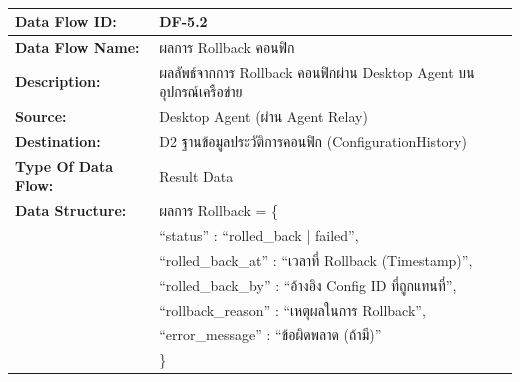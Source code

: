 \begin{table}[H]
    \caption{}
    \label{tab:df-5-2}
    \fontSixTeen 
    \begin{tabularx}{\textwidth}{|l|L|} 
        \hline
        \textbf{Data Flow ID:} & DF-5.2 \\
        \hline
        \textbf{Data Flow Name:} & ผลการ Rollback คอนฟิก \\
        \hline
        \textbf{Description:} & ผลลัพธ์จากการ Rollback คอนฟิกผ่าน Desktop Agent บนอุปกรณ์เครือข่าย \\
        \hline
        \textbf{Source:} & Desktop Agent (ผ่าน Agent Relay) \\
        \hline
        \textbf{Destination:} & D2 ฐานข้อมูลประวัติการคอนฟิก (ConfigurationHistory) \\
        \hline
        \textbf{Type Of Data Flow:} & Result Data \\
        \hline
        \textbf{Data Structure:} & ผลการ Rollback = \{ \nonumber \\
                        & \hspace{1em} ``status'' : ``rolled\_back | failed'', \nonumber \\
                        & \hspace{1em} ``rolled\_back\_at'' : ``เวลาที่ Rollback (Timestamp)'', \nonumber \\
                        & \hspace{1em} ``rolled\_back\_by'' : ``อ้างอิง Config ID ที่ถูกแทนที่'', \nonumber \\
                        & \hspace{1em} ``rollback\_reason'' : ``เหตุผลในการ Rollback'', \nonumber \\
                        & \hspace{1em} ``error\_message'' : ``ข้อผิดพลาด (ถ้ามี)'' \nonumber \\
                        & \} \\
        \hline
    \end{tabularx}
\end{table}


